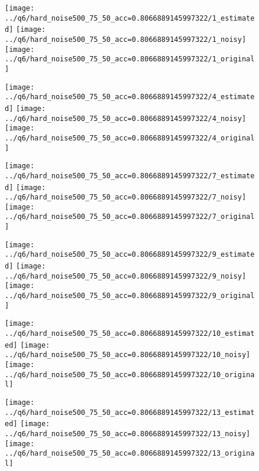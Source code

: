 \documentclass[a4paper,12pt]{article}
\begin{document}
\begin{figure}[!htb]
  \texttt{[image: ../q6/hard\_noise500\_75\_50\_acc=0.8066889145997322/1\_estimated]}
\endminipage\hfill
{}
  \texttt{[image: ../q6/hard\_noise500\_75\_50\_acc=0.8066889145997322/1\_noisy]}
\endminipage\hfill
{}
  \texttt{[image: ../q6/hard\_noise500\_75\_50\_acc=0.8066889145997322/1\_original]}
\endminipage\hfill

  \texttt{[image: ../q6/hard\_noise500\_75\_50\_acc=0.8066889145997322/4\_estimated]}
\endminipage\hfill
{}
  \texttt{[image: ../q6/hard\_noise500\_75\_50\_acc=0.8066889145997322/4\_noisy]}
\endminipage\hfill
{}
  \texttt{[image: ../q6/hard\_noise500\_75\_50\_acc=0.8066889145997322/4\_original]}
\endminipage\hfill

  \texttt{[image: ../q6/hard\_noise500\_75\_50\_acc=0.8066889145997322/7\_estimated]}
\endminipage\hfill
{}
  \texttt{[image: ../q6/hard\_noise500\_75\_50\_acc=0.8066889145997322/7\_noisy]}
\endminipage\hfill
{}
  \texttt{[image: ../q6/hard\_noise500\_75\_50\_acc=0.8066889145997322/7\_original]}
\endminipage\hfill

  \texttt{[image: ../q6/hard\_noise500\_75\_50\_acc=0.8066889145997322/9\_estimated]}
\endminipage\hfill
{}
  \texttt{[image: ../q6/hard\_noise500\_75\_50\_acc=0.8066889145997322/9\_noisy]}
\endminipage\hfill
{}
  \texttt{[image: ../q6/hard\_noise500\_75\_50\_acc=0.8066889145997322/9\_original]}
\endminipage\hfill

  \texttt{[image: ../q6/hard\_noise500\_75\_50\_acc=0.8066889145997322/10\_estimated]}
\endminipage\hfill
{}
  \texttt{[image: ../q6/hard\_noise500\_75\_50\_acc=0.8066889145997322/10\_noisy]}
\endminipage\hfill
{}
  \texttt{[image: ../q6/hard\_noise500\_75\_50\_acc=0.8066889145997322/10\_original]}
\endminipage\hfill

  \texttt{[image: ../q6/hard\_noise500\_75\_50\_acc=0.8066889145997322/13\_estimated]}
\endminipage\hfill
{}
  \texttt{[image: ../q6/hard\_noise500\_75\_50\_acc=0.8066889145997322/13\_noisy]}
\endminipage\hfill
{}
  \texttt{[image: ../q6/hard\_noise500\_75\_50\_acc=0.8066889145997322/13\_original]}
\endminipage\hfill


\end{figure}
\end{document}

